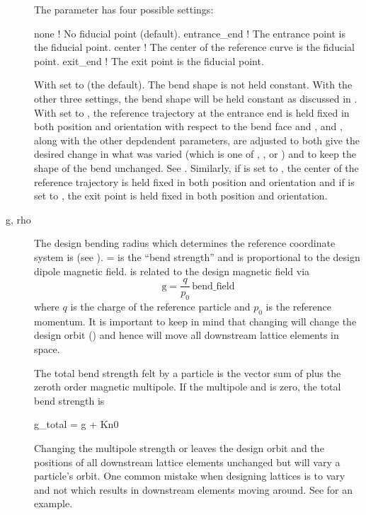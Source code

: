\begin{description}
The  parameter
has four possible settings:
\begin{example}
  none          ! No fiducial point (default).
  entrance_end  ! The entrance point is the fiducial point.
  center        ! The center of the reference curve is the fiducial point.
  exit_end      ! The exit point is the fiducial point.
\end{example}
With  set to  (the default). The bend shape is not held constant. With the
other three settings, the bend shape will be held constant as discussed in .
With  set to , the reference trajectory at the entrance end is held
fixed in both position and orientation with respect to the bend face and ,  and ,
along with the other depdendent parameters, are adjusted to both give the desired change in what was
varied (which is one of , ,  or ) and to keep the shape of the
bend unchanged. See . Similarly, if  is set to , the
center of the reference trajectory is held fixed in both position and orientation and if
 is set to , the exit point is held fixed in both position and
orientation.
  \item[g, rho] \Newline
The design bending radius which determines the reference coordinate system is  (see
).  =  is the ``bend strength'' and is proportional to the design
dipole magnetic field.  is related to the design magnetic field  via
\begin{equation}
  \text{g} = \frac{q}{p_0} \, \text{bend_field} 
  \label{gqpb}
\end{equation}
where $q$ is the charge of the reference particle and $p_0$ is the reference momentum. It is
important to keep in mind that changing  will change the design orbit () and
hence will move all downstream lattice elements in space.

The total bend strength felt by a particle is the vector sum of  plus the zeroth order
magnetic multipole. If the multipole  and  is zero, the total bend strength is
\begin{example}
  g_total = g + Kn0
\end{example}
Changing the multipole strength  or  leaves the design orbit and the positions of
all downstream lattice elements
unchanged but will vary a particle's orbit. One common mistake when designing lattices is to vary
 and not  which results in downstream elements moving around. See 
for an example.


\end{description}
